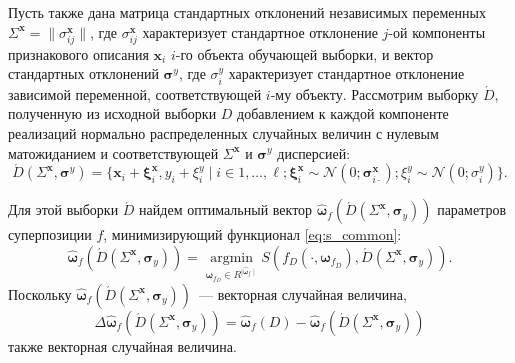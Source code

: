 \documentclass[12pt,a4paper]{article}
\begin{document}
Пусть также дана матрица стандартных отклонений
независимых переменных $\Sigma^{\mathbf{x}} = \| \sigma^{\mathbf{x}}_{ij} \|$,
где $\sigma^{\mathbf{x}}_{ij}$ характеризует стандартное отклонение $j$-ой
компоненты признакового описания $\mathbf{x}_i$ $i$-го объекта обучающей выборки,
и вектор стандартных отклонений $\boldsymbol{\sigma}^y$, где $\sigma^y_i$
характеризует стандартное отклонение зависимой переменной, соответствующей
$i$-му объекту.
Рассмотрим выборку $\acute{D}$, полученную из исходной выборки $D$
добавлением к каждой компоненте реализаций нормально распределенных
случайных величин с нулевым матожиданием и соответствующей
$\Sigma^{\mathbf{x}}$ и $\boldsymbol{\sigma}^y$ дисперсией:
\begin{equation}
  \acute{D}(\Sigma^{\mathbf{x}}, \boldsymbol{\sigma}^y) = \{ \mathbf{x}_i + \boldsymbol{\xi}^{\mathbf{x}}_i, y_i + \xi^y_i \mid i \in 1, \dots, \ell; \boldsymbol{\xi}^{\mathbf{x}}_i \sim \mathcal{N}(0; \boldsymbol{\sigma}^{\mathbf{x}}_{i \cdot}); \xi^y_i \sim \mathcal{N}(0; \sigma^y_i) \}.
  \label{eq:d_acute}
\end{equation}

Для этой выборки $\acute{D}$ найдем оптимальный вектор $\hat{\boldsymbol{\omega}}_f (\acute{D} (\Sigma^{\mathbf{x}}, \boldsymbol{\sigma}_y))$
параметров суперпозиции $f$, минимизирующий функционал \eqref{eq:s_common}:
\begin{equation}
  \hat{\boldsymbol{\omega}}_f (\acute{D} (\Sigma^{\mathbf{x}}, \boldsymbol{\sigma}_y)) = \mathop{\arg \min}\limits_{\boldsymbol{\omega}_{f_D} \in R^{\mid \hat{\boldsymbol{\omega}}_f \mid}} S (f_D (\cdot, \boldsymbol{\omega}_{f_D}), \acute{D} (\Sigma^{\mathbf{x}}, \boldsymbol{\sigma}_y)).
  \label{eq:hat_omega}
\end{equation}
Поскольку $\hat{\boldsymbol{\omega}}_f (\acute{D} (\Sigma^{\mathbf{x}}, \boldsymbol{\sigma}_y))$~---
векторная случайная величина,
\[
  \Delta\hat{\boldsymbol{\omega}}_f(\acute{D} (\Sigma^{\mathbf{x}}, \boldsymbol{\sigma}_y) ) = \hat{\boldsymbol{\omega}}_f(D) - \hat{\boldsymbol{\omega}}_f (\acute{D} (\Sigma^{\mathbf{x}}, \boldsymbol{\sigma}_y))
\]
также векторная случайная величина.
\end{document}
